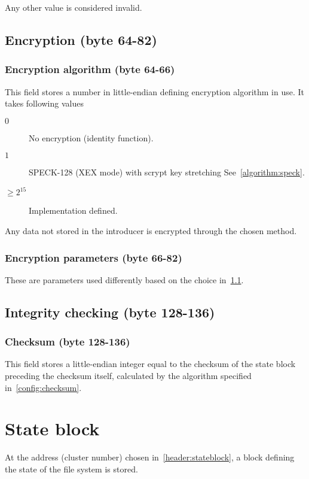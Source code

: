 \documentclass[11pt,a4paper]{report}
\begin{document}
        Any other value is considered invalid.

    \section{Encryption (byte 64-82)}
        \subsection{Encryption algorithm (byte 64-66)}
        \label{header:encryption}
        This field stores a number in little-endian defining encryption
        algorithm in use. It takes following values

        \begin{description}
            \item [$0$] No encryption (identity function).
            \item [$1$] SPECK-128 (XEX mode) with scrypt key stretching
                See~\ref{algorithm:speck}.
            \item [$\geq 2^{15}$] Implementation defined.
        \end{description}

        Any data not stored in the introducer is encrypted through the chosen method.

        \subsection{Encryption parameters (byte 66-82)}
        \label{header:encryptionparams}
        These are parameters used differently based on the choice
        in~\ref{header:encryption}.

    \section{Integrity checking (byte 128-136)}
        \subsection{Checksum (byte 128-136)}
        This field stores a little-endian integer equal to the checksum of the
        state block preceding the checksum itself, calculated by the algorithm
        specified in~\ref{config:checksum}.

    \chapter{State block}
    \label{stateblock}
    At the address (cluster number) chosen in~\ref{header:stateblock}, a block
    defining the state of the file system is stored.
\end{document}
